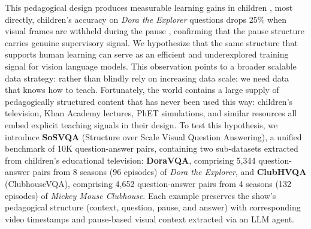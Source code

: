 \documentclass{article}
\begin{document}
\sosvqafigure


This pedagogical design produces measurable learning gains in children \cite{linebarger2005vocabulary, angin2017spatial}, most directly, children's accuracy on \textit{Dora the Explorer} questions drops 25\% when visual frames are withheld during the pause \cite{pozzulo2012culprit}, confirming that the pause structure carries genuine supervisory signal. We hypothesize that the same structure that supports human learning can serve as an efficient and underexplored training signal for vision language models. This observation points to a broader scalable data strategy: rather than blindly rely on increasing data scale; we need data that knows how to teach. Fortunately, the world contains a large supply of pedagogically structured content that has never been used this way: children's television, Khan Academy lectures, PhET simulations, and similar resources all embed explicit teaching signals in their design.  To test this hypothesis, we introduce \textbf{SoSVQA} (Structure over Scale Visual Question Answering), a unified benchmark of 10K question-answer pairs, containing two sub-datasets extracted from children's educational television: \textbf{DoraVQA}, comprising 5{,}344 question-answer pairs from 8 seasons (96 episodes) of \textit{Dora the Explorer}, and \textbf{ClubHVQA} (ClubhouseVQA), comprising 4{,}652 question-answer pairs from 4 seasons (132 episodes) of \textit{Mickey Mouse Clubhouse}. Each example preserves the show's pedagogical structure (context, question, pause, and answer) with corresponding video timestamps and pause-based visual context extracted via an LLM agent.
\end{document}
